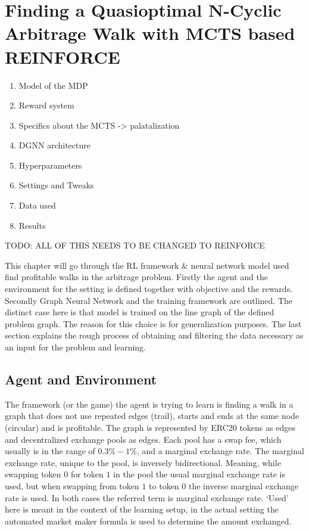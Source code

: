 \chapter{Finding a Quasioptimal N-Cyclic Arbitrage Walk with MCTS based
REINFORCE}
\begin{enumerate}
    \item Model of the MDP
    \item Reward system
    \item Specifics about the MCTS -> palatalization
    \item DGNN architecture
    \item Hyperparameters
    \item Settings and Tweaks
    \item Data used
    \item Results
\end{enumerate}
TODO: ALL OF THIS NEEDS TO BE CHANGED TO REINFORCE

This chapter will go through the RL framework \& neural network model used
find profitable walks in the arbitrage problem. Firstly the agent and the
environment for the setting is defined together with objective and the
rewards. Secondly Graph Neural Network and the training framework are
outlined. The distinct case here is that model is trained on the line graph
of the defined problem graph. The reason for this choice is for
generalization purposes. The last section explains the rough process of
obtaining and filtering the data necessary as an input for the problem and
learning.

\section{Agent and Environment}
The framework (or the game) the agent is trying to learn is finding a walk
in a graph that does not use repeated edges (trail), starts and ends at
the same node (circular) and is profitable. The graph is represented by ERC20 \cite{erc20}
tokens as edges and decentralized exchange pools as edges. Each pool has a
swap fee, which usually is in the range of $0.3\%-1\%$, and a marginal
exchange rate. The marginal exchange rate, unique to the pool, is inversely
bidirectional. Meaning, while swapping token $0$ for token $1$ in the pool
the usual marginal exchange rate is used, but when swapping from token $1$ to
token $0$ the inverse marginal exchange rate is used. In both cases the
referred term is marginal exchange rate. `Used' here is meant in the context
of the learning setup, in the actual setting the automated market maker
formula is used to determine the amount exchanged.
\newline

